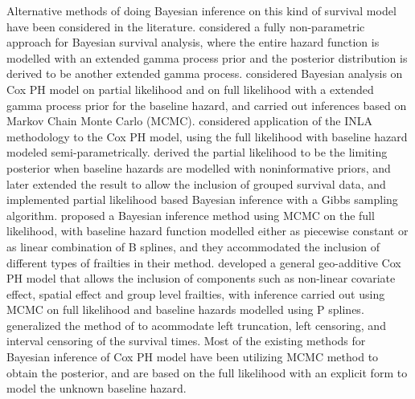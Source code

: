 \documentclass[ba]{imsart}
\begin{document}
Alternative methods of doing Bayesian inference on this kind of survival model have been considered in the literature. \cite{BayesianNonpara} considered a fully non-parametric approach for Bayesian survival analysis, where the entire hazard function is modelled with an extended gamma process prior and the posterior distribution is derived to be another extended gamma process. \cite{BayesianPartialMCMC} considered Bayesian analysis on Cox PH model on partial likelihood and on full likelihood with a extended gamma process prior for the baseline hazard, and carried out inferences based on Markov Chain Monte Carlo (MCMC). \cite{inlacoxph} considered application of the INLA methodology to the Cox PH model, using the full likelihood with baseline hazard modeled semi-parametrically. \cite{PartialandFull1} derived the partial likelihood to be the limiting posterior when baseline hazards are modelled with noninformative priors, and \cite{PartialandFull2} later extended the result to allow the inclusion of grouped survival data, and implemented partial likelihood based Bayesian inference with a Gibbs sampling algorithm. \cite{henschel2009semiparametric} proposed a Bayesian inference method using MCMC on the full likelihood, with baseline hazard function modelled either as piecewise constant or as linear combination of B splines, and they accommodated the inclusion of different types of frailties in their method. \cite{hennerfeind2006geoadditive} developed a general geo-additive Cox PH model that allows the inclusion of components such as non-linear covariate effect, spatial effect and group level frailties, with inference carried out using MCMC on full likelihood and baseline hazards modelled using P splines. \cite{kneib2005geoadditive} generalized the method of \cite{hennerfeind2006geoadditive} to acommodate left truncation, left censoring, and interval censoring of the survival times. Most of the existing methods for Bayesian inference of Cox PH model have been utilizing MCMC method to obtain the posterior, and are based on the full likelihood with an explicit form to model the unknown baseline hazard.
\end{document}
